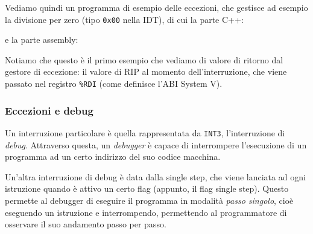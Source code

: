 \documentclass[a4paper,11pt]{article}
\begin{document}
\par\medskip

Vediamo quindi un programma di esempio delle eccezioni, che gestisce ad esempio la divisione per zero (tipo \lstinline|0x00| nella IDT), di cui la parte C++:
\lstset{style=codestyle, language=C++}

e la parte assembly:
\lstset{style=codestyle, language=assembler}


Notiamo che questo è il primo esempio che vediamo di valore di ritorno dal gestore di eccezione: il valore di RIP al momento dell'interruzione, che viene passato nel registro \lstinline|%RDI| (come definisce l'ABI System V).

\subsubsection{Eccezioni e debug}
Un interruzione particolare è quella rappresentata da \lstinline|INT3|, l'interruzione di \textit{debug}.
Attraverso questa, un \textit{debugger} è capace di interrompere l'esecuzione di un programma ad un certo indirizzo del suo codice macchina.

Un'altra interruzione di debug è data dalla single step, che viene lanciata ad ogni istruzione quando è attivo un certo flag (appunto, il flag single step). Questo permette al debugger di eseguire il programma in modalità \textit{passo singolo}, cioè eseguendo un istruzione e interrompendo, permettendo al programmatore di osservare il suo andamento passo per passo.

\par\smallskip
\end{document}
